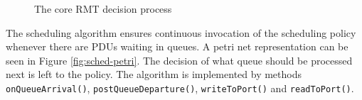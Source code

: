             \begin{figure}[H]
                \begin{center}
                  \caption{The core RMT decision process}
                  \label{fig:rmt-fsm}
                \end{center}
            \end{figure}

            The scheduling algorithm ensures continuous invocation of the scheduling policy whenever there are PDUs waiting in queues. A petri net representation can be seen in Figure \ref{fig:sched-petri}. The decision of what queue should be processed next is left to the policy. The algorithm is implemented by methods \texttt{onQueueArrival()}, \texttt{postQueueDeparture()}, \texttt{writeToPort()} and \texttt{readToPort()}.

